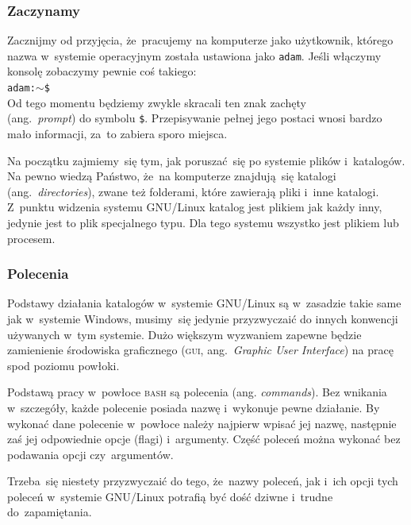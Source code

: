 \documentclass[10pt,t]{beamer}
\begin{document}
\begin{frame}
  \frametitle{Zaczynamy}


  Zacznijmy od przyjęcia, że~pracujemy na komputerze jako użytkownik,
  którego nazwa w~systemie operacyjnym została ustawiona jako
  \texttt{adam}. Jeśli włączymy konsolę zobaczymy pewnie coś takiego: \\
  \texttt{adam:$\sim$\$} \\
  Od tego momentu będziemy zwykle skracali ten znak zachęty \\
  (ang.~\textit{prompt}) do symbolu \texttt{\$}. Przepisywanie pełnej jego
  postaci wnosi bardzo mało informacji, za~to zabiera sporo miejsca.

  Na początku zajmiemy~się tym, jak poruszać~się po systemie plików
  i~katalogów. Na pewno wiedzą Państwo, że~na komputerze znajdują~się
  katalogi (ang.~\textit{directories}), zwane też folderami, które zawierają
  pliki i~inne katalogi. Z~punktu widzenia systemu GNU/Linux
  katalog jest plikiem jak każdy inny, jedynie jest to plik specjalnego
  typu. Dla tego systemu wszystko jest plikiem lub procesem.

\end{frame}





\begin{frame}
  \frametitle{Polecenia}


  Podstawy działania katalogów w~systemie GNU/Linux są w~zasadzie takie
  same jak w~systemie Windows, musimy~się jedynie przyzwyczaić do innych
  konwencji używanych w~tym systemie. Dużo większym wyzwaniem zapewne
  będzie zamienienie środowiska graficznego (\textsc{gui},
  ang.~\textit{Graphic User Interface}) na pracę spod poziomu powłoki.

  Podstawą pracy w~powłoce \textsc{bash} są polecenia (ang.
  \textit{commands}). Bez wnikania w~szczegóły, każde polecenie posiada
  nazwę i~wykonuje pewne działanie. By wykonać dane polecenie w~powłoce
  należy najpierw wpisać jej nazwę, następnie zaś jej odpowiednie
  opcje (flagi) i~argumenty. Część poleceń można wykonać bez podawania opcji
  czy~argumentów.

  Trzeba~się niestety przyzwyczaić do tego, że~nazwy poleceń, jak i~ich
  opcji tych poleceń w~systemie GNU/Linux potrafią być dość dziwne i~trudne
  do~zapamiętania.

\end{frame}
\end{document}
